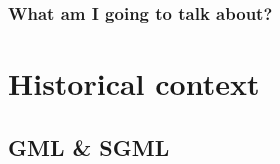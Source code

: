 

\frame
{
	\frametitle{What am I going to talk about?}
	
	\tableofcontents
}




\section{Historical context}




\newlength{\yearposition}

\newcommand{\timeline}[1]{%
	\begin{textblock}{10}(1.4,7.75)
		\tiny
		\setcounter{yearvalue}{#1-1960}
		\setlength{\yearposition}{\value{yearvalue}cm/4}
		\begin{pgfpicture}{0cm}{0cm}{10cm}{1cm}
			\pgfsetlinewidth{1pt}
			\color{beamerstructure}
			\pgfline{\pgfpoint{\yearposition}{0cm}}{\pgfpoint{\yearposition}{0.5cm}}
			\pgfputat{\pgfpoint{\yearposition}{0.55cm}}{\pgfbox[right,bottom]{#1}}
			\color{nzcslightorange!75!nzcsdarkorange}
			\pgfsetlinewidth{0.5pt}
			\pgfrect[fill]{\pgfxy(0,0)}{\pgfpoint{\yearposition}{0.5cm}}
			\color{black}
			\pgfrect[stroke]{\pgfxy(0,0)}{\pgfxy(10,0.5)}
			\pgfxyline(0,0)(0,0.75)
			\pgfxyline(2.5,0)(2.5,0.75)
			\pgfxyline(5,0)(5,0.75)
			\pgfxyline(7.5,0)(7.5,0.75)
			\pgfxyline(10,0)(10,0.75)
			\pgfputat{\pgfxy(0,1)}{\pgfbox[center,top]{1960}}
			\pgfputat{\pgfxy(2.5,1)}{\pgfbox[center,top]{1970}}
			\pgfputat{\pgfxy(5,1)}{\pgfbox[center,top]{1980}}
			\pgfputat{\pgfxy(7.5,1)}{\pgfbox[center,top]{1990}}
			\pgfputat{\pgfxy(10,1)}{\pgfbox[center,top]{2000}}
		\end{pgfpicture}
	\end{textblock}
}




\subsection*{GML \& SGML}






